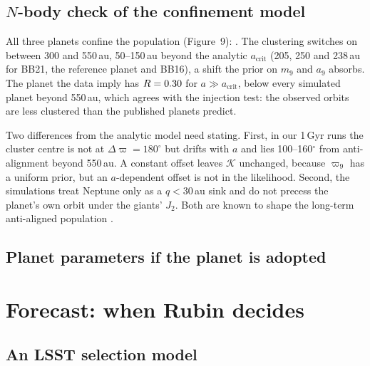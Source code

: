 \documentclass[twocolumn,linenumbers]{aastex631}
\newcommand{\vpi}{\varpi}
\newcommand{\Kbf}{\mathcal{K}}
\begin{document}
\subsection{$N$-body check of the confinement model}\label{sec:nbodyres}
All three planets confine the population (Figure~9): \NbodySummary. The clustering switches on between 300 and 550\,au, 50--150\,au beyond the analytic $a_\mathrm{crit}$ (205, 250 and 238\,au for BB21, the reference planet and BB16), a shift the prior on $m_9$ and $a_9$ absorbs. The planet the data imply has $R=0.30$ for $a\gg a_\mathrm{crit}$, below every simulated planet beyond 550\,au, which agrees with the injection test: the observed orbits are less clustered than the published planets predict.

Two differences from the analytic model need stating. First, in our 1\,Gyr runs the cluster centre is not at $\Delta\vpi=180^\circ$ but drifts with $a$ and lies 100--160$^\circ$ from anti-alignment beyond 550\,au. A constant offset leaves $\Kbf$ unchanged, because $\vpi_9$ has a uniform prior, but an $a$-dependent offset is not in the likelihood. Second, the simulations treat Neptune only as a $q<30$\,au sink and do not precess the planet's own orbit under the giants' $J_2$. Both are known to shape the long-term anti-aligned population \citep{Batygin2016,Brown2021}.

\subsection{Planet parameters if the planet is adopted}\label{sec:posterior}

\section{Forecast: when Rubin decides}\label{sec:forecast}

\subsection{An LSST selection model}\label{sec:lsstsel}
\end{document}
